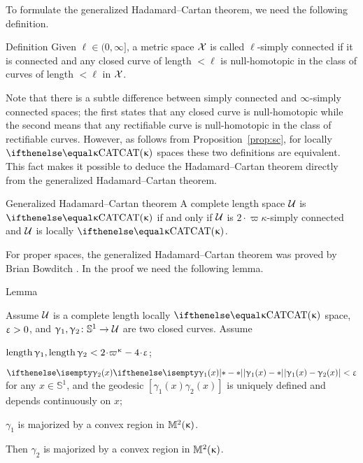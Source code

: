 To formulate the generalized Hadamard--Cartan theorem,
we need the following definition.

\begin{thm}{Definition}\label{def:l-s.c.}
Given $\ell\in (0,\infty]$,
a metric space $\mathcal{X}$ is called 
$\ell$-simply connected 
if it is connected and 
any closed curve of length $<\ell$ 
is null-homotopic in the class of curves of length $<\ell$ in $\mathcal{X}$.
\end{thm}

Note that there is a subtle difference between 
simply connected and $\infty$-simply connected spaces;
the first states that any closed curve is null-homotopic while the second means that any rectifiable curve is null-homotopic in the class of rectifiable curves.
However, as follows from Proposition~\ref{prop:sc}, for locally $\CAT\kappa$ spaces these two definitions are equivalent.
This fact makes it possible to deduce the Hadamard--Cartan theorem directly from the generalized Hadamard--Cartan theorem.

\begin{thm}{Generalized Hadamard--Cartan theorem}\label{thm:hadamard-cartan-gen}
A complete length space
$\mathcal{U}$ is $\CAT\kappa$ 
if and only if $\mathcal{U}$ is $2\cdot\varpi\kappa$-simply connected
and $\mathcal{U}$ is locally $\CAT\kappa$.
\end{thm}

For proper spaces, the generalized Hadamard--Cartan theorem was proved by Brian Bowditch \cite{bowditch}.
In the proof we need the following lemma.

\begin{thm}{Lemma}

Assume $\mathcal{U}$ is a complete length  locally $\CAT\kappa$ space,
$\upvarepsilon>0$,
and $\gamma_1,\gamma_2\:\mathbb{S}^1\to\spc{U}$ are two closed curves.
Assume 
\begin{subthm}{}
$\length\gamma_1,\length\gamma_2<2\cdot\varpi\kappa-4\cdot\eps$;
\end{subthm}
 
\begin{subthm}{} $\dist{\gamma_1(x)}{\gamma_2(x)}{}<\eps$ for any $x\in\mathbb{S}^1$, and the geodesic $[\gamma_1(x)\gamma_2(x)]$ is uniquely defined and depends continuously on $x$;
\end{subthm}

\begin{subthm}{}  $\gamma_1$ is majorized by a convex region in $\mathbb{M}_{{}}^{2}({\upkappa})$.
\end{subthm}

Then  $\gamma_2$ is majorized by a convex region in $\mathbb{M}_{{}}^{2}({\upkappa})$.
\end{thm}

